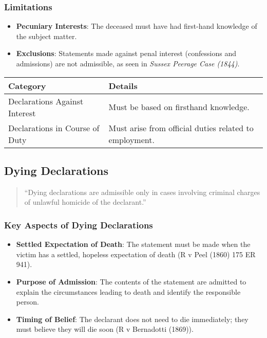 \subsubsection{Limitations}\label{limitations}

\begin{itemize}
\tightlist
\item
  \textbf{Pecuniary Interests}: The deceased must have had first-hand
  knowledge of the subject matter.
\item
  \textbf{Exclusions}: Statements made against penal interest
  (confessions and admissions) are not admissible, as seen in
  \emph{Sussex Peerage Case (1844)}.
\end{itemize}

\begin{longtable}[]{@{}
  >{\raggedright\arraybackslash}p{}
  >{\raggedright\arraybackslash}p{}@{}}
\toprule\noalign{}
\begin{minipage}[b]{\linewidth}\raggedright
Category
\end{minipage} & \begin{minipage}[b]{\linewidth}\raggedright
Details
\end{minipage} \\
\midrule\noalign{}
\endhead
\bottomrule\noalign{}
\endlastfoot
Declarations Against Interest & Must be based on firsthand knowledge. \\
Declarations in Course of Duty & Must arise from official duties related
to employment. \\
\end{longtable}

\subsection{  Dying Declarations}\label{dying-declarations}

\begin{quote}
``Dying declarations are admissible only in cases involving criminal
charges of unlawful homicide of the declarant.''
\end{quote}

\subsubsection{Key Aspects of Dying
Declarations}\label{key-aspects-of-dying-declarations}

\begin{itemize}
\tightlist
\item
  \textbf{Settled Expectation of Death}: The statement must be made when
  the victim has a settled, hopeless expectation of death (R v Peel
  (1860) 175 ER 941).
\item
  \textbf{Purpose of Admission}: The contents of the statement are
  admitted to explain the circumstances leading to death and identify
  the responsible person.
\item
  \textbf{Timing of Belief}: The declarant does not need to die
  immediately; they must believe they will die soon (R v Bernadotti
  (1869)).
\end{itemize}

